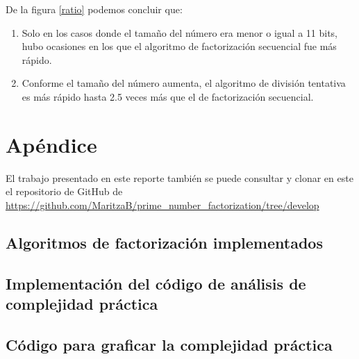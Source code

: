 \documentclass{article}
\begin{document}
De la figura \ref{ratio} podemos concluir que:
\begin{enumerate}
\item Solo en los casos donde el tamaño del número era menor o igual a 11 bits,
hubo ocasiones en los que el algoritmo de factorización secuencial fue más
rápido.
\item Conforme el tamaño del número aumenta, el algoritmo de división tentativa
es más rápido hasta 2.5 veces más que el de factorización secuencial.
\end{enumerate}

\pagebreak
 


\pagebreak
\section{Apéndice}

El trabajo presentado en este reporte también se puede consultar y clonar en
este el repositorio de GitHub de \url{https://github.com/MaritzaB/prime_number_factorization/tree/develop}

\subsection{Algoritmos de factorización implementados} \label{sec:algoritmos}



\pagebreak

\subsection{Implementación del código de análisis de complejidad práctica} \label{sec:complejidad}



\pagebreak
\subsection{Código para graficar la complejidad práctica} \label{sec:grafica}


\end{document}
